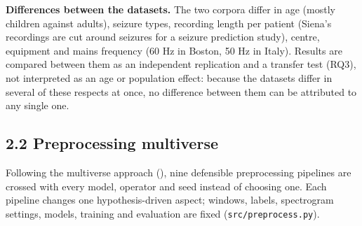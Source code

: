\documentclass[11pt,a4paper]{article}
\begin{document}
\textbf{Differences between the datasets.} The two corpora differ in age (mostly children
against adults), seizure types, recording length per patient (Siena's
recordings are cut around seizures for a seizure prediction study), centre,
equipment and mains frequency (60 Hz in Boston, 50 Hz in Italy). Results are
compared between them as an independent replication and a transfer test (RQ3), not
interpreted as an age or population effect: because the datasets differ in several of
these respects at once, no difference between them can be attributed to any single
one.

\subsection{2.2 Preprocessing multiverse}\label{preprocessing-multiverse}

Following the multiverse approach (\citealp{Steegen_2016}), nine defensible
preprocessing pipelines are crossed with every model, operator and seed instead of
choosing one. Each pipeline changes one hypothesis-driven aspect; windows, labels,
spectrogram settings, models, training and evaluation are fixed (\nolinkurl{src/preprocess.py}).

\begingroup\small
\end{document}
